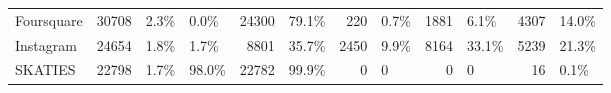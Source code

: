 \begin{tabular}{lrllrlrlrlrl}
Foursquare          &       30708 &        2.3\% &                 0.0\% &             24300 &             79.1\% &               220 &              0.7\% &              1881 &              6.1\% &             4307 &            14.0\% \\
Instagram           &       24654 &        1.8\% &                 1.7\% &              8801 &             35.7\% &              2450 &              9.9\% &              8164 &             33.1\% &             5239 &            21.3\% \\
SKATIES             &       22798 &        1.7\% &                98.0\% &             22782 &             99.9\% &                 0 &                 0 &                 0 &                 0 &               16 &             0.1\% \\
\bottomrule
\end{tabular}
